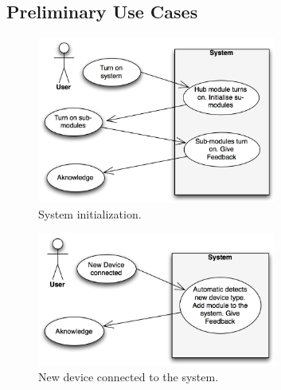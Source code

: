 \subsection{Preliminary Use Cases}

\begin{figure}[!h]
	\begin{centering}
		\includegraphics[width=0.7\textwidth]{images/usecases1.jpg}
		\caption{System initialization. }
	\end{centering}
\end{figure}

\begin{figure}[!h]
	\begin{centering}
		\includegraphics[width=0.7\textwidth]{images/usecases2.jpg}
		\caption{New device connected to the system. }
	\end{centering}
\end{figure}
\newpage

